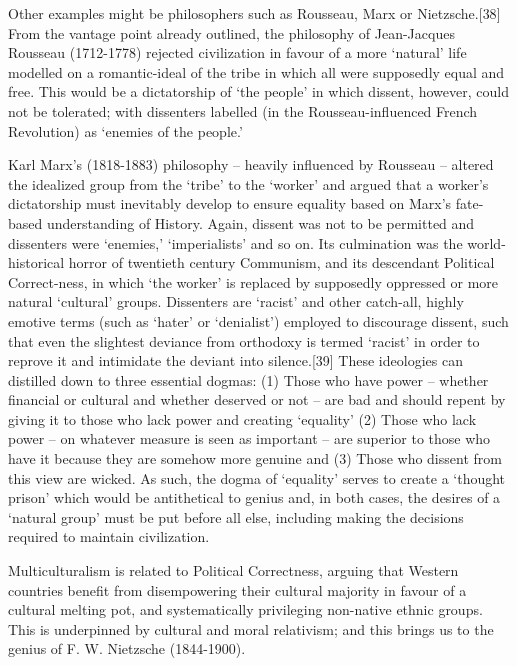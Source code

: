 \documentclass[
]{book}
\begin{document}
Other examples might be philosophers such as Rousseau, Marx or Nietzsche.{[}38{]} From the vantage point already outlined, the philosophy of Jean-Jacques Rousseau (1712-1778) rejected civilization in favour of a more `natural' life modelled on a romantic-ideal of the tribe in which all were supposedly equal and free. This would be a dictatorship of `the people' in which dissent, however, could not be tolerated; with dissenters labelled (in the Rousseau-influenced French Revolution) as `enemies of the people.'

Karl Marx's (1818-1883) philosophy -- heavily influenced by Rousseau -- altered the idealized group from the `tribe' to the `worker' and argued that a worker's dictatorship must inevitably develop to ensure equality based on Marx's fate-based understanding of History. Again, dissent was not to be permitted and dissenters were `enemies,' `imperialists' and so on. Its culmination was the world-historical horror of twentieth century Communism, and its descendant Political Correct-ness, in which `the worker' is replaced by supposedly oppressed or more natural `cultural' groups. Dissenters are `racist' and other catch-all, highly emotive terms (such as `hater' or `denialist') employed to discourage dissent, such that even the slightest deviance from orthodoxy is termed `racist' in order to reprove it and intimidate the deviant into silence.{[}39{]} These ideologies can distilled down to three essential dogmas: (1) Those who have power -- whether financial or cultural and whether deserved or not -- are bad and should repent by giving it to those who lack power and creating `equality' (2) Those who lack power -- on whatever measure is seen as important -- are superior to those who have it because they are somehow more genuine and (3) Those who dissent from this view are wicked. As such, the dogma of `equality' serves to create a `thought prison' which would be antithetical to genius and, in both cases, the desires of a `natural group' must be put before all else, including making the decisions required to maintain civilization.

Multiculturalism is related to Political Correctness, arguing that Western countries benefit from disempowering their cultural majority in favour of a cultural melting pot, and systematically privileging non-native ethnic groups. This is underpinned by cultural and moral relativism; and this brings us to the genius of F. W. Nietzsche (1844-1900).
\end{document}
